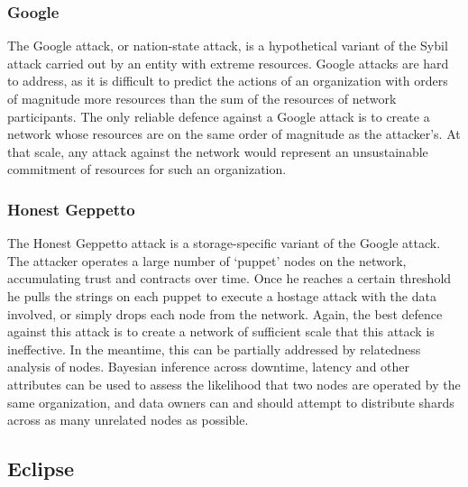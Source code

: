 \documentclass[a4paper,10pt]{article}
\begin{document}
\subsubsection{Google}

The Google attack, or nation-state attack, is a hypothetical variant of the
Sybil attack carried out by an entity with extreme resources. Google attacks are
hard to address, as it is difficult to predict the actions of an organization
with orders of magnitude more resources than the sum of the resources of network
participants. The only reliable defence against a Google attack is to create a
network whose resources are on the same order of magnitude as the attacker’s. At
that scale, any attack against the network would represent an unsustainable
commitment of resources for such an organization.

\subsubsection{Honest Geppetto}

The Honest Geppetto attack is a storage-specific variant of the Google attack.
The attacker operates a large number of ‘puppet’ nodes on the network,
accumulating trust and contracts over time. Once he reaches a certain threshold
he pulls the strings on each puppet to execute a hostage attack with the data
involved, or simply drops each node from the network. Again, the best defence
against this attack is to create a network of sufficient scale that this attack
is ineffective. In the meantime, this can be partially addressed by relatedness
analysis of nodes. Bayesian inference across downtime, latency and other
attributes can be used to assess the likelihood that two nodes are operated by
the same organization, and data owners can and should attempt to distribute
shards across as many unrelated nodes as possible.

\subsection{Eclipse}
\end{document}
